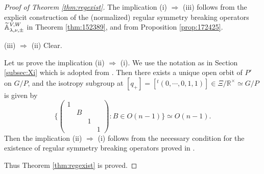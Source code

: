 \begin{proof}[Proof of Theorem \ref{thm:regexist}]
The implication (i) $\Rightarrow$ (iii) follows from the explicit construction
 of the (normalized) regular symmetry breaking operators
 ${\widetilde{\mathbb{A}}}_{{\lambda},{\nu},{\pm}}^{{V,W}}$
 in Theorem \ref{thm:152389}, 
 and from Proposition \ref{prop:172425}.  



(iii) $\Rightarrow$ (ii) Clear.  



Let us prove the implication (ii) $\Rightarrow$ (i).  
We use the notation as in Section \ref{subsec:Xi}
 which is adopted from \cite[Chap.~5] {sbon}.  
Then there exists a unique open orbit of $P'$ on $G/P$, 
 and the isotropy subgroup
 at 
$[q_+] =[{}^{t}\!(0,\cdots,0,1,1)]\in \Xi/{\mathbb{R}}^{\times} \simeq G/P$
 is given by 
\[
   \{\begin{pmatrix} 1 & & & \\ & B & & \\ & & 1 & \\ & & & 1\end{pmatrix}:
 B \in O(n-1)\}
 \simeq O(n-1).  
\]
Then the implication (ii) $\Rightarrow$ (i) follows from
 the necessary condition
 for the existence of regular symmetry breaking operators proved in 
 \cite[Prop.~3.5]{sbon}.  



Thus Theorem \ref{thm:regexist} is proved.  
\end{proof}


